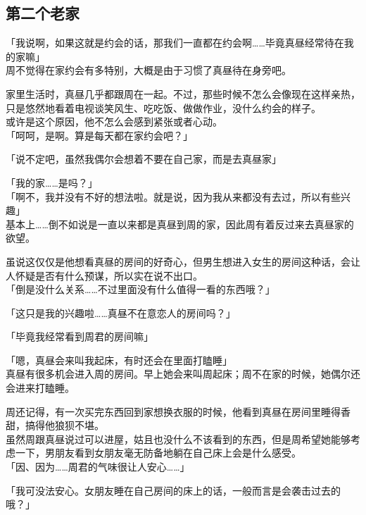 \subsection{第二个老家}

「我说啊，如果这就是约会的话，那我们一直都在约会啊……毕竟真昼经常待在我的家嘛」\\

周不觉得在家约会有多特别，大概是由于习惯了真昼待在身旁吧。

家里生活时，真昼几乎都跟周在一起。不过，那些时候不怎么会像现在这样亲热，只是悠然地看着电视谈笑风生、吃吃饭、做做作业，没什么约会的样子。\\

或许是这个原因，他不怎么会感到紧张或者心动。\\

「呵呵，是啊。算是每天都在家约会吧？」

「说不定吧，虽然我偶尔会想着不要在自己家，而是去真昼家」

「我的家……是吗？」\\

「啊不，我并没有不好的想法啦。就是说，因为我从来都没有去过，所以有些兴趣」\\

基本上……倒不如说是一直以来都是真昼到周的家，因此周有着反过来去真昼家的欲望。

虽说这仅仅是他想看真昼的房间的好奇心，但男生想进入女生的房间这种话，会让人怀疑是否有什么预谋，所以实在说不出口。\\

「倒是没什么关系……不过里面没有什么值得一看的东西哦？」

「这只是我的兴趣啦……真昼不在意恋人的房间吗？」

「毕竟我经常看到周君的房间嘛」

「嗯，真昼会来叫我起床，有时还会在里面打瞌睡」\\

真昼有很多机会进入周的房间。早上她会来叫周起床；周不在家的时候，她偶尔还会进来打瞌睡。

周还记得，有一次买完东西回到家想换衣服的时候，他看到真昼在房间里睡得香甜，搞得他狼狈不堪。\\

虽然周跟真昼说过可以进屋，姑且也没什么不该看到的东西，但是周希望她能够考虑一下，男朋友看到女朋友毫无防备地躺在自己床上会是什么感受。\\

「因、因为……周君的气味很让人安心……」

「我可没法安心。女朋友睡在自己房间的床上的话，一般而言是会袭击过去的哦？」

